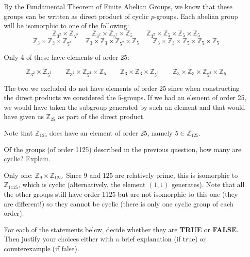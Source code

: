 \documentclass[11pt]{exam}
\def\Z{\mathbb Z}
\begin{document}
\begin{questions}
\begin{solution}
By the Fundamental Theorem of Finite Abelian Groups, we know that these groups can be written as direct product of cyclic $p$-groups.  Each abelian group will be isomorphic to one of the following:
\[\Z_{3^2} \times \Z_{5^3} \qquad \Z_{3^2} \times \Z_{5^2}\times \Z_5\qquad \Z_{3^2} \times \Z_{5}\times \Z_5\times \Z_5\]
\[\Z_{3}\times \Z_3 \times \Z_{5^3} \qquad \Z_{3}\times \Z_3 \times \Z_{5^2}\times \Z_5\qquad \Z_{3}\times \Z_3 \times \Z_{5}\times \Z_5\times \Z_5\]

Only 4 of these have elements of order 25:

\[\Z_{3^2} \times \Z_{5^3} \qquad \Z_{3^2} \times \Z_{5^2}\times \Z_5 \qquad \Z_{3}\times \Z_3 \times \Z_{5^3} \qquad \Z_{3}\times \Z_3 \times \Z_{5^2}\times \Z_5 \]

The two we excluded do not have elements of order 25 since when constructing the direct products we considered the $5$-groups.  If we had an element of order 25, we would have taken the subgroup generated by such an element and that would have given us $\Z_{25}$ as part of the direct product.

Note that $\Z_{125}$ does have an element of order 25, namely $5 \in \Z_{125}$.
\end{solution}

\vfill
\question[4] Of the groups (of order 1125) described in the previous question, how many are cyclic?  Explain.
\begin{solution}
Only one: $\Z_{9}\times \Z_{125}$.  Since $9$ and $125$ are relatively prime, this is isomorphic to $\Z_{1125}$, which is cyclic (alternatively, the element $(1,1)$ generates).  Note that all the other groups still have order $1125$ but are not isomorphic to this one (they are different!) so they cannot be cyclic (there is only one cyclic group of each order).
\end{solution}

\vfill

\newpage

\question[16] For each of the statements below, decide whether they are \textbf{TRUE} or \textbf{FALSE}.  Then justify your choices either with a brief explanation (if true) or counterexample (if false).
\end{questions}
\end{document}
